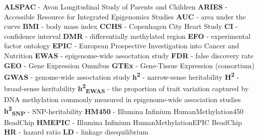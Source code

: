 \documentclass[11pt,oneside]{bristolthesis}
\begin{document}
  \hypersetup{linkcolor=black}
  {
  \setcounter{tocdepth}{2}
  \setcounter{secnumdepth}{2}
  \tableofcontents
  }
  \listoftables
  \listoffigures
  \begin{abbreviations}
    \textbf{ALSPAC} - Avon Longitudinal Study of Parents and Children \newline
    \textbf{ARIES} - Accessible Resource for Integrated Epigenomics Studies \newline
    \textbf{AUC} - area under the curve \newline
    \textbf{BMI} - body mass index \newline
    \textbf{CCHS} - Copenhagen City Heart Study \newline
    \textbf{CI} - confidence interval \newline
    \textbf{DMR} - differentially methylated region \newline
    \textbf{EFO} - experimental factor ontology \newline
    \textbf{EPIC} - European Prospective Investigation into Cancer and Nutrition \newline
    \textbf{EWAS} - epigenome-wide assoctation study \newline
    \textbf{FDR} - false discovery rate \newline
    \textbf{GEO} - Gene Expression Omnibus \newline
    \textbf{GTEx} - Gene-Tissue Expression (consortium) \newline
    \textbf{GWAS} - genome-wide assoctation study \newline
    \textbf{h\textsuperscript{2}} - narrow-sense heritability \newline
    \textbf{H\textsuperscript{2}} - broad-sense heritability \newline
    \textbf{h\textsuperscript{2}\textsubscript{EWAS}} - the proportion of trait variation captured by DNA methylation commonly measured in epigenome-wide association studies \newline
    \textbf{h\textsuperscript{2}\textsubscript{SNP}} - SNP-heritability \newline
    \textbf{HM450} - Illumina Infinium HumanMethylation450 BeadChip \newline
    \textbf{HMEPIC} - Illumina Infinium HumanMethylationEPIC BeadChip \newline
    \textbf{HR} - hazard ratio
    \textbf{LD} - linkage disequilibrium \newline

\end{abbreviations}
\end{document}
